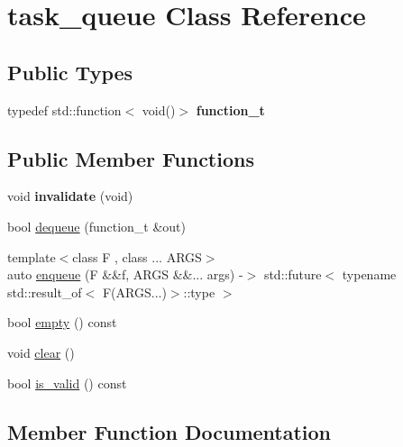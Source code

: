 \hypertarget{classtask__queue}{}\section{task\+\_\+queue Class Reference}
\label{classtask__queue}
\subsection*{Public Types}
\begin{DoxyCompactItemize}
\item 
\mbox{\label{classtask__queue_a54e486a36bec1abf4df464d82f8f7c69}} 
typedef std\+::function$<$ void()$>$ {\bfseries function\+\_\+t}
\end{DoxyCompactItemize}
\subsection*{Public Member Functions}
\begin{DoxyCompactItemize}
\item 
\mbox{\label{classtask__queue_a3f49e001092757da141a3067744f6af0}} 
void {\bfseries invalidate} (void)
\item 
bool \hyperlink{classtask__queue_a8febb9f611ff31bc105027c7d90784a6}{dequeue} (function\+\_\+t \&out)
\item 
{\footnotesize template$<$class F , class ... A\+R\+GS$>$ }\\auto \hyperlink{classtask__queue_ac9fce851e5f4eecd014ef0130f0db4bc}{enqueue} (F \&\&f, A\+R\+GS \&\&... args) -\/$>$ std\+::future$<$ typename std\+::result\+\_\+of$<$ F(A\+R\+G\+S...)$>$\+::type $>$
\item 
bool \hyperlink{classtask__queue_a124dd18ea98e42ae705f7835fd0c69cf}{empty} () const
\item 
void \hyperlink{classtask__queue_aded81b6de1995651057c306166c8ae8b}{clear} ()
\item 
bool \hyperlink{classtask__queue_a75e723aa9cc68a264d63b40b3ef3f280}{is\+\_\+valid} () const
\end{DoxyCompactItemize}


\subsection{Member Function Documentation}
\mbox{\label{classtask__queue_aded81b6de1995651057c306166c8ae8b}} 
